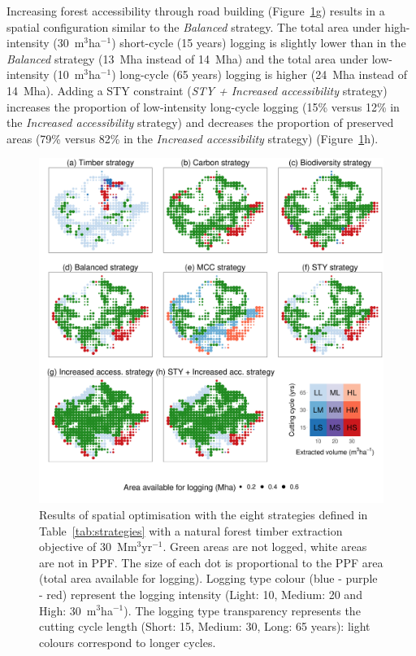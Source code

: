 \documentclass[12pt]{article}
\begin{document}
Increasing forest accessibility through road building (Figure~\ref{fig:mapsStrateg}g) results in a spatial configuration similar to the \textit{Balanced} strategy. The total area under high-intensity (30~m$^3$ha$^{-1}$) short-cycle (15 years) logging is slightly lower than in the \textit{Balanced} strategy (13~Mha instead of 14~Mha) and the total area under low-intensity (10~m$^3$ha$^{-1}$) long-cycle (65 years) logging is higher (24~Mha instead of 14~Mha). Adding a STY constraint (\textit{STY + Increased accessibility} strategy) increases the proportion of low-intensity long-cycle logging (15\% versus 12\% in the \textit{Increased accessibility} strategy) and decreases the proportion of preserved areas (79\% versus 82\% in the \textit{Increased accessibility} strategy)  (Figure~\ref{fig:mapsStrateg}h). 


\begin{figure}
    \centering
    \includegraphics[width=0.8\linewidth]{graphs/mapsScenarios.pdf}
    \caption{Results of spatial optimisation with the eight strategies defined in Table~\ref{tab:strategies} with a natural forest timber extraction objective of 30~Mm$^3$yr$^{-1}$. Green areas are not logged, white areas are not in PPF. The size of each dot is proportional to the PPF area (total area available for logging). Logging type colour (blue - purple - red) represent the logging intensity (Light: 10, Medium: 20 and High: 30~m$^3$ha$^{-1}$). The logging type transparency represents the cutting cycle length (Short: 15, Medium: 30, Long: 65 years): light colours correspond to longer cycles.}
    \label{fig:mapsStrateg}
\end{figure}
\end{document}
